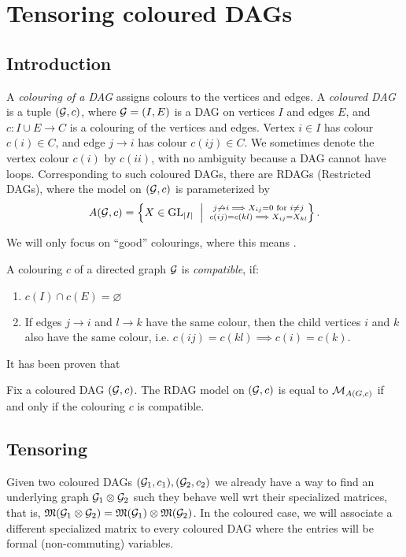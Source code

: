 \section{Tensoring coloured DAGs}

\subsection{Introduction}

A \emph{colouring of a DAG} assigns colours to the vertices and edges. A \emph{coloured DAG} is a tuple $({\mathcal{G}},c)$, where ${\mathcal{G}} = (I,E)$ is a DAG on vertices $I$ and edges $E$, and $c:I\cup E\to C$ is a colouring of the vertices and edges. Vertex $i \in I$ has colour $c(i) \in C$, and edge $j \to i$ has colour $c(ij) \in C$. We sometimes denote the vertex colour $c(i)$ by $c(ii)$, with no ambiguity because a DAG cannot have loops. Corresponding to such coloured DAGs, there are RDAGs (Restricted DAGs), where the model on $({\mathcal{G}},c)$ is parameterized by $$A(\cG,c) = \set{X\in \GL_{\abs{I}} \st \substack{j\not\to i \implies X_{ij}=0 \text{ for } i\neq j\\c(ij) = c(kl)\implies X_{ij} = X_{kl}}}.$$

We will only focus on ``good'' colourings, where this means .
\begin{defn}
A colouring $c$ of a directed graph ${\mathcal{G}}$ is \emph{compatible}, if:
\begin{enumerate}[label=(\alph*),itemsep=0pt]
\item $c(I)\cap c(E) = \varnothing$
\item If edges $j \to i$ and $l \to k$ have the same colour, then the child vertices $i$ and $k$ also have the same colour, i.e. $c(ij) = c(kl) \implies c(i) = c(k)$.
\end{enumerate}
\end{defn}

It has been proven that 
\begin{prop}
Fix a coloured DAG $({\mathcal{G}},c)$. The RDAG model on $({\mathcal{G}},c)$ is equal to
${\mathcal{M}}_{A(G,c)}$ if and only if the colouring $c$ is compatible.
\end{prop}

\subsection{Tensoring}

Given two coloured DAGs $({\mathcal{G}}_1,c_1), ({\mathcal{G}}_2,c_2)$ we already have a way to find an underlying graph ${\mathcal{G}}_1\otimes {\mathcal{G}}_2$ such they behave well wrt their specialized matrices, that is, ${\mathfrak{M}}({\mathcal{G}}_1\otimes {\mathcal{G}}_2) = {\mathfrak{M}}({\mathcal{G}}_1)\otimes {\mathfrak{M}}({\mathcal{G}}_2)$. In the coloured case, we will associate a different specialized matrix to every coloured DAG where the entries will be formal (non-commuting) variables. 

